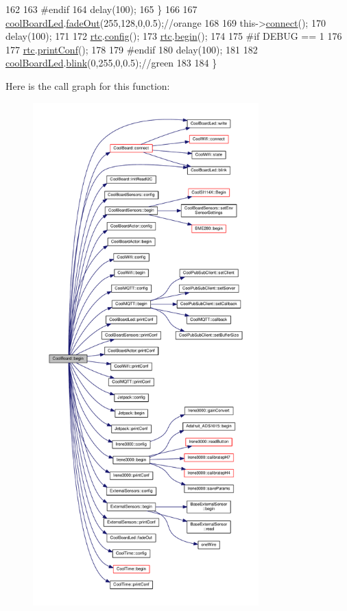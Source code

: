 \begin{DoxyCode}
162 
163 \textcolor{preprocessor}{    #endif}
164         delay(100);
165     \}
166     
167     \hyperlink{class_cool_board_a1b1d3c684a5baa56b08486e192fd8e97}{coolBoardLed}.\hyperlink{class_cool_board_led_a93d545679237e8cc858324367149775c}{fadeOut}(255,128,0,0.5);\textcolor{comment}{//orange}
168 
169     this->\hyperlink{class_cool_board_a519de78b807f8ec6463ff484eb925918}{connect}();
170     delay(100);
171 
172     \hyperlink{class_cool_board_a50d2a6716879d64a85f3c6b44ad63275}{rtc}.\hyperlink{class_cool_time_a87c28260c1bc77091162cbcf1ee2e129}{config}();
173     \hyperlink{class_cool_board_a50d2a6716879d64a85f3c6b44ad63275}{rtc}.\hyperlink{class_cool_time_ab1976cf718b950bc31e003c3323b8adb}{begin}();
174 
175 \textcolor{preprocessor}{#if DEBUG == 1}
176 
177     \hyperlink{class_cool_board_a50d2a6716879d64a85f3c6b44ad63275}{rtc}.\hyperlink{class_cool_time_af355e7f9b3898211cd2ff25eab5933b1}{printConf}();
178 
179 \textcolor{preprocessor}{#endif}
180     delay(100);
181     
182     \hyperlink{class_cool_board_a1b1d3c684a5baa56b08486e192fd8e97}{coolBoardLed}.\hyperlink{class_cool_board_led_a96e1ea13003eee34c9dbcef340404426}{blink}(0,255,0,0.5);\textcolor{comment}{//green}
183 
184 \}
\end{DoxyCode}
Here is the call graph for this function\+:\nopagebreak
\begin{figure}[H]
\begin{center}
\leavevmode
\includegraphics[height=550pt]{d7/df9/class_cool_board_acba7c5aef7268b2c0044bdb54d3b9d76_cgraph}
\end{center}
\end{figure}
